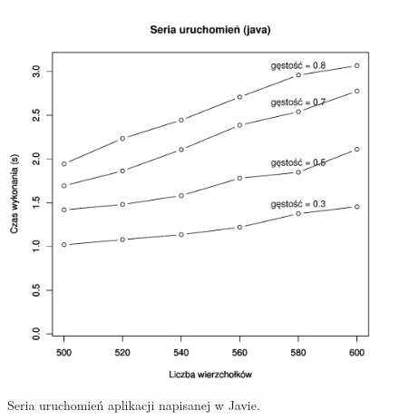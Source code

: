 \begin{figure}
\centering
\includegraphics[scale=0.6]{plots/javaTime_inSeries.pdf}
\caption{Seria uruchomień aplikacji napisanej w Javie.}
\label{p:javaSeries}
\end{figure}